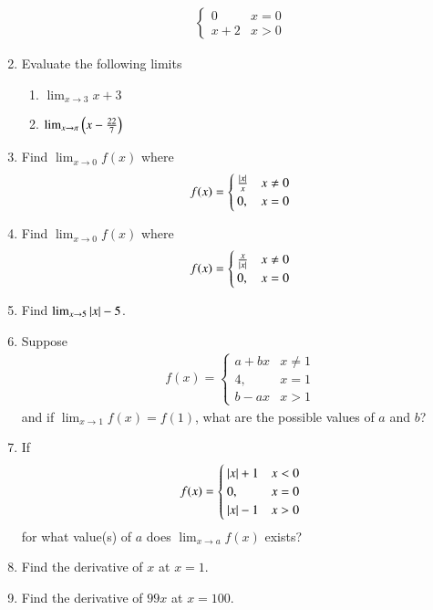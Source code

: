 \begin{enumerate}[label=\arabic*.,ref=\thesubsection.\theenumi]
\begin{align}
\begin{cases}
0 & x = 0
\\
x+2 & x > 0
\end{cases}
\end{align}
\item Evaluate the following limits
\begin{enumerate}
\item $\lim_{x\to 3}x+3$
\item $\lim_{x\to \pi}\left(x-\frac{22}{7}\right)$
\end{enumerate}
%
\item Find $\lim_{x\to 0} f(x)$ where
\begin{align}
f(x) = 
\begin{cases}
\frac{\left\vert x\right\vert}{x} & x \ne 0
\\
0, & x = 0
\end{cases}
\end{align}
%
\item Find $\lim_{x\to 0} f(x)$ where
\begin{align}
f(x) = 
\begin{cases}
\frac{x}{\left\vert x\right\vert} & x \ne 0
\\
0, & x = 0
\end{cases}
\end{align}
%
\item Find $\lim_{x\to 5} \left\vert x\right\vert-5$.
%
\item Suppose
\begin{align}
f(x) = 
\begin{cases}
a+bx & x \ne 1
\\
4, & x = 1
\\
b-ax & x > 1
\end{cases}
\end{align}
%
and if $\lim_{x\to 1}f(x) = f(1)$, what are the possible values of $a$ and $b$?
%
\item If
\begin{align}
f(x) = 
\begin{cases}
\left\vert x\right\vert+1 & x < 0
\\
0, & x = 0
\\
\left\vert x\right\vert-1 & x > 0
\end{cases}
\end{align}
%
for what value(s) of $a$ does $\lim_{x\to a}f(x)$ exists?

\item Find the derivative of $x$ at $x = 1$.
\item Find the derivative of $99x$ at $x = 100$.


\end{enumerate}
